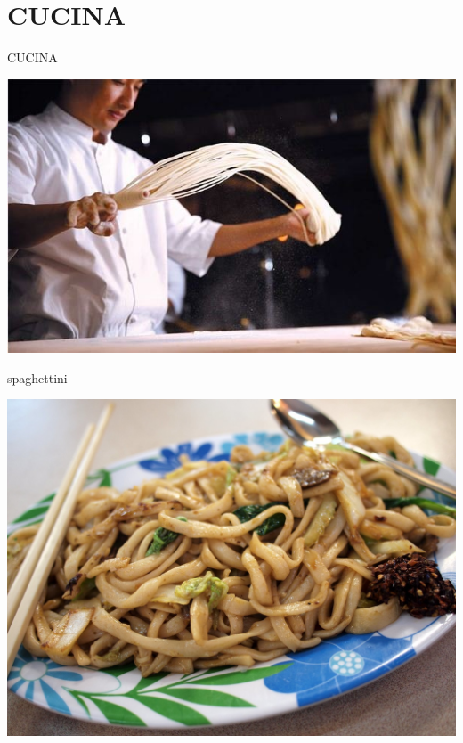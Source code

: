 \documentclass[presentation]{beamer}
\begin{document}
\section{CUCINA}
\label{sec:org18388ef}
\begin{frame}[label={sec:org3a924ae}]{CUCINA}
\begin{center}
\includegraphics[width=.9\linewidth]{./immagini/spaghetti.jpg}
\end{center}
\end{frame}
\begin{frame}[label={sec:org6eca146}]{spaghettini}
\begin{center}
\includegraphics[width=.9\linewidth]{./immagini/udon.jpg}
\end{center}
\end{frame}
\end{document}
